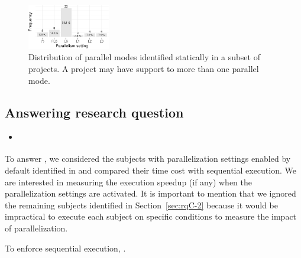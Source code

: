 \begin{figure}[h!]
    \centering
    \includegraphics[width=0.32\textwidth]{plots/barplot-modes-static.pdf}
    \caption{\label{fig:freqmodes-static}Distribution of parallel modes 
    identified statically in a subset of \numProjectsPar{} projects.
    A project may have support to more than one parallel mode.}
\end{figure}

\begin{center}
\end{center}

\subsection{Answering research question \numRQD{}}
\label{sec:rqD}

\begin{itemize}
    \item \emph{\RQD}
\end{itemize}

To answer \numRQD{}, we considered the \numProjectsPar{} subjects with
parallelization settings enabled by default identified in \numRQC{}
and compared their time cost with sequential execution. We are
interested in measuring the execution speedup (if any) when the
parallelization settings are activated. It is important to mention
that we ignored the remaining  subjects identified in
Section~\ref{sec:rqC-2} because it would be impractical to execute
each subject on specific conditions to measure the impact of
parallelization.

To enforce sequential execution, .


